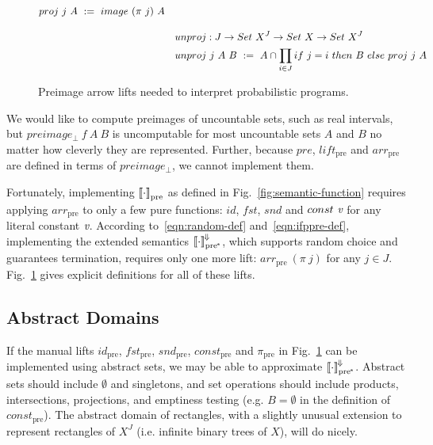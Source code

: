 \documentclass{llncs}
\newcommand{\figref}[1]{Fig.~\ref{#1}}
\newcommand{\conv}{^{\mspace{-2mu}\Downarrow\mspace{-2mu}}}
\newcommand{\meaningofconv}[1]{\left\llbracket{#1}\right\rrbracket\conv}
\newcommand{\pre}{_\mathrm{pre}}
\newcommand{\ppre}{_\mathrm{pre^{\mspace{-2mu}*}}}
\begin{document}
\begin{figure}[!tb]
\begin{align*}
\begin{aligned}[t]
\begin{aligned}[t]
		&proj~j~A \ := \ image~(\pi~j)~A
	\end{aligned} \\
\\[-6pt]
	&\begin{aligned}[t]
		&unproj : J \to Set~X^J \to Set~X \to Set~X^J \\
		&unproj~j~A~B \ := \ A \cap \prod_{i \in J} if~j = i~then~B~else~proj~j~A
	\end{aligned}
\end{aligned}
\end{align*}
\bottomhrule
\caption[ ]{Preimage arrow lifts needed to interpret probabilistic programs.}
\label{fig:extra-preimage-arrow-defs}
\end{figure}

We would like to compute preimages of uncountable sets, such as real intervals, but $preimage_\bot~f~A~B$ is uncomputable for most uncountable sets $A$ and $B$ no matter how cleverly they are represented.
Further, because $pre$, $lift\pre$ and $arr\pre$ are defined in terms of $preimage_\bot$, we cannot implement them.

Fortunately, implementing $\meaningof{\cdot}\pre$ as defined in \figref{fig:semantic-function} requires applying $arr\pre$ to only a few pure functions: $id$, $fst$, $snd$ and $const~\emph{v}$ for any literal constant $\emph{v}$.
According to~\eqref{eqn:random-def} and~\eqref{eqn:ifppre-def}, implementing the extended semantics $\meaningofconv{\cdot}\ppre$, which supports random choice and guarantees termination, requires only one more lift: $arr\pre~(\pi~j)$ for any $j \in J$.
\figref{fig:extra-preimage-arrow-defs} gives explicit definitions for all of these lifts.

\subsection{Abstract Domains}

If the manual lifts $id\pre$, $fst\pre$, $snd\pre$, $const\pre$ and $\pi\pre$ in \figref{fig:extra-preimage-arrow-defs} can be implemented using abstract sets, we may be able to approximate $\meaningofconv{\cdot}\ppre$.
Abstract sets should include $\emptyset$ and singletons, and set operations should include products, intersections, projections, and emptiness testing (e.g. $B = \emptyset$ in the definition of $const\pre$).
The abstract domain of rectangles, with a slightly unusual extension to represent rectangles of $X^J$ (i.e. infinite binary trees of $X$), will do nicely.
\end{document}
